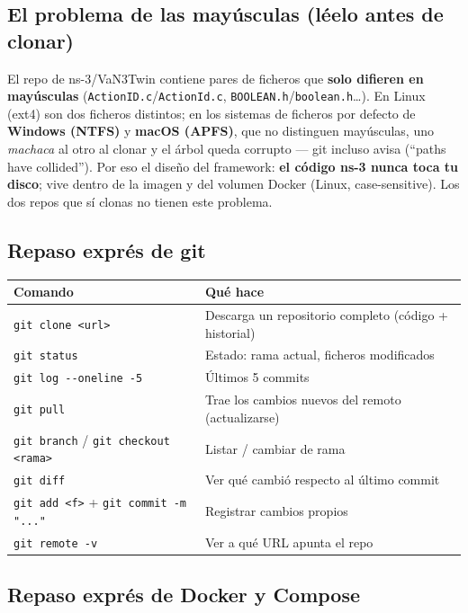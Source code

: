 \documentclass[11pt,a4paper]{article}
\begin{document}
\subsection{El problema de las mayúsculas (léelo antes de clonar)}
\label{sec:fs}

El repo de ns-3/VaN3Twin contiene pares de ficheros que \textbf{solo difieren
en mayúsculas} (\texttt{ActionID.c}/\texttt{ActionId.c},
\texttt{BOOLEAN.h}/\texttt{boolean.h}\ldots). En Linux (ext4) son dos
ficheros distintos; en los sistemas de ficheros por defecto de
\textbf{Windows (NTFS)} y \textbf{macOS (APFS)}, que no distinguen
mayúsculas, uno \emph{machaca} al otro al clonar y el árbol queda corrupto
--- git incluso avisa (``paths have collided''). Por eso el diseño del
framework: \textbf{el código ns-3 nunca toca tu disco}; vive dentro de la
imagen y del volumen Docker (Linux, case-sensitive). Los dos repos que sí
clonas no tienen este problema.

\subsection{Repaso exprés de git}

\begin{center}
\small
\begin{tabular}{@{}ll@{}}
\toprule
\textbf{Comando} & \textbf{Qué hace} \\
\midrule
\texttt{git clone <url>} & Descarga un repositorio completo (código + historial) \\
\texttt{git status} & Estado: rama actual, ficheros modificados \\
\texttt{git log -{}-oneline -5} & Últimos 5 commits \\
\texttt{git pull} & Trae los cambios nuevos del remoto (actualizarse) \\
\texttt{git branch} / \texttt{git checkout <rama>} & Listar / cambiar de rama \\
\texttt{git diff} & Ver qué cambió respecto al último commit \\
\texttt{git add <f>} + \texttt{git commit -m "..."} & Registrar cambios propios \\
\texttt{git remote -v} & Ver a qué URL apunta el repo \\
\bottomrule
\end{tabular}
\end{center}

\subsection{Repaso exprés de Docker y Compose}
\end{document}

